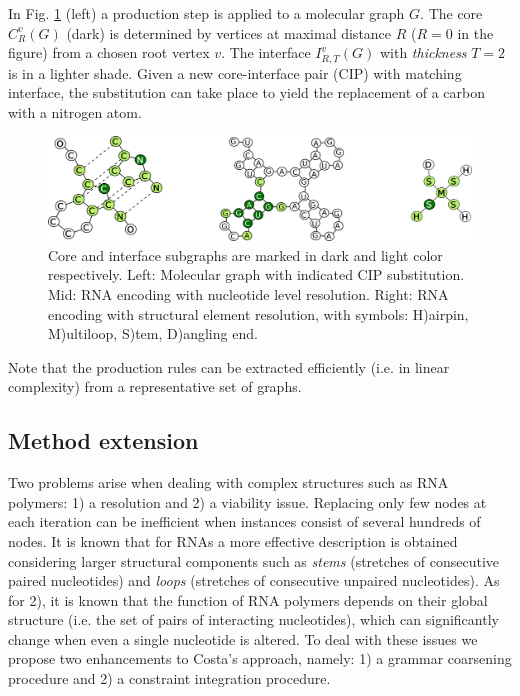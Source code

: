 \documentclass{article}
\begin{document}
In Fig. \ref{allcips} (left) a production step is applied to a molecular graph
$G$. The core $C_{R}^v(G)$ (dark) is determined by vertices at maximal
distance $R$ ($R=0$ in the figure) from a chosen root vertex $v$. The
interface $I_{R,T}^v(G)$ with \emph{thickness} $T=2$ is in a lighter shade.
Given a new core-interface pair (CIP) with matching interface, the
substitution can take place to yield the replacement of a carbon with a
nitrogen atom.

\begin{figure}[ht]
      \centering
        \includegraphics[width=0.7\linewidth]{images/allcipsinone.png}
      \caption{
      Core and interface subgraphs are marked in dark and light color
      respectively. Left: Molecular graph with indicated CIP substitution.
      Mid: RNA encoding with nucleotide level resolution.  Right:  RNA encoding with structural element resolution, with symbols: H)airpin, M)ultiloop, S)tem, D)angling end.}
      \label{allcips}
\end{figure}

Note that the production rules can be extracted efficiently (i.e. in linear
complexity) from a representative set of graphs.



\subsection{Method extension}

Two problems arise when dealing with complex structures such as RNA polymers:
1) a resolution and 2) a viability issue. Replacing only few nodes at each
iteration can be inefficient when instances consist of several hundreds of
nodes. It is known that for RNAs a more effective description is obtained
considering larger structural components such as {\em stems} (stretches of
consecutive paired nucleotides) and {\em loops} (stretches of consecutive
unpaired nucleotides). As for 2), it is known that the function of RNA
polymers depends on their global structure (i.e. the set of pairs of
interacting nucleotides), which can significantly change when even a single
nucleotide is altered. To deal with these issues we propose two enhancements
to Costa's approach, namely: 1) a grammar coarsening procedure and
2) a constraint integration procedure.
\end{document}
